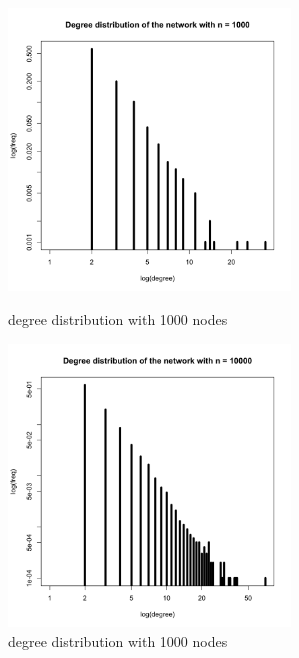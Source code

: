 \documentclass[draftcls,12pt,onecolumn]{IEEEtran}
\begin{document}
\begin{figure}[htbp]
\centering
\begin{minipage}[t]{0.48\textwidth}
\centering
\includegraphics[width=7.5cm]{1_2_d_degsmall.png}
\caption{degree distribution with 1000 nodes}
\end{minipage}
\begin{minipage}[t]{0.48\textwidth}
\centering
\includegraphics[width=7.5cm]{1_2_d_deglarge.png}
\caption{degree distribution with 1000 nodes}
\end{minipage}
\end{figure}
\end{document}

